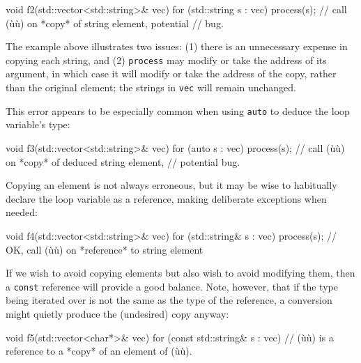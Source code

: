 {{{\begin{emcppslisting}[emcppsbatch=e5]
void f2(std::vector<std::string>& vec)
{
    for (std::string s : vec)
    {
        process(s);  // call (ù{}ù) on *copy* of string element, potential
                     // bug.
    }
}
\end{emcppslisting}
    

\noindent The example above illustrates two issues: (1) there is an unnecessary
expense in copying each string, and (2) \lstinline!process! may modify or
take the address of its argument, in which case it will modify or take
the address of the copy, rather than the original element; the strings
in \lstinline!vec! will remain unchanged.

This error appears to be especially common when using \lstinline!auto! to
deduce the loop variable's type:

\begin{emcppslisting}[emcppsbatch=e5]
void f3(std::vector<std::string>& vec)
{
    for (auto s : vec)
    {
        process(s);  // call (ù{}ù) on *copy* of deduced string element,
                     // potential bug.
    }
}
\end{emcppslisting}
    

\noindent Copying an element is not always erroneous, but it may be wise to
habitually declare the loop variable as a reference, making deliberate
exceptions when needed:

\begin{emcppslisting}[emcppsbatch=e5]
void f4(std::vector<std::string>& vec)
{
    for (std::string& s : vec)
    {
        process(s);  // OK, call (ù{}ù) on *reference* to string element
    }
}
\end{emcppslisting}
    

\noindent If we wish to avoid copying elements but also wish to avoid modifying
them, then a \lstinline!const! reference will provide a good balance. Note,
however, that if the type being iterated over is not the same as the
type of the reference, a conversion might quietly produce the
(undesired) copy anyway:

\begin{emcppslisting}[emcppsbatch=e5]
void f5(std::vector<char*>& vec)
{
    for (const std::string& s : vec)
    {
        // (ù{}ù) is a reference to a *copy* of an element of (ù{}ù).
    }
}
\end{emcppslisting}
    

}}}
